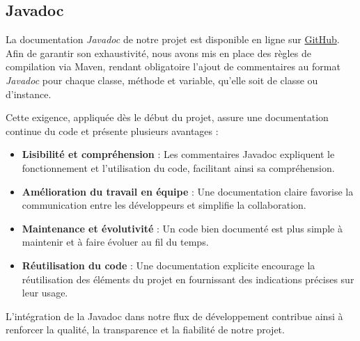 \subsection{Javadoc}

La documentation \emph{Javadoc} de notre projet est disponible en ligne sur \href{https://gr4-m3acnl.github.io/hashi/}{GitHub}. Afin de garantir son exhaustivité, nous avons mis en place des règles de compilation via Maven, rendant obligatoire l'ajout de commentaires au format \emph{Javadoc} pour chaque classe, méthode et variable, qu'elle soit de classe ou d'instance.  

Cette exigence, appliquée dès le début du projet, assure une documentation continue du code et présente plusieurs avantages :

\begin{itemize}
    \item \textbf{Lisibilité et compréhension} : Les commentaires Javadoc expliquent le fonctionnement et l'utilisation du code, facilitant ainsi sa compréhension.
    \item \textbf{Amélioration du travail en équipe} : Une documentation claire favorise la communication entre les développeurs et simplifie la collaboration.
    \item \textbf{Maintenance et évolutivité} : Un code bien documenté est plus simple à maintenir et à faire évoluer au fil du temps.
    \item \textbf{Réutilisation du code} : Une documentation explicite encourage la réutilisation des éléments du projet en fournissant des indications précises sur leur usage.
\end{itemize}

L'intégration de la Javadoc dans notre flux de développement contribue ainsi à renforcer la qualité, la transparence et la fiabilité de notre projet.
